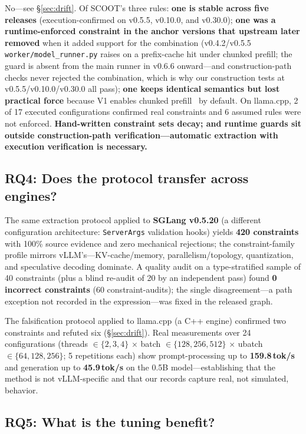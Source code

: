 \documentclass[journal]{IEEEtran}
\newcommand{\code}[1]{\texttt{#1}}
\begin{document}
No---see \S\ref{sec:drift}. Of SCOOT's three rules: \textbf{one is stable across five releases} (execution-confirmed on v0.5.5, v0.10.0, and v0.30.0); \textbf{one was a runtime-enforced constraint in the anchor versions that upstream later removed} when it added support for the combination (v0.4.2/v0.5.5 \code{worker/model\_runner.py} raises on a prefix-cache hit under chunked prefill; the guard is absent from the main runner in v0.6.6 onward---and construction-path checks never rejected the combination, which is why our construction tests at v0.5.5/v0.10.0/v0.30.0 all pass); \textbf{one keeps identical semantics but lost practical force} because V1 enables chunked prefill~\cite{ref14} by default. On llama.cpp, 2 of 17 executed configurations confirmed real constraints and 6 assumed rules were not enforced. \textbf{Hand-written constraint sets decay; and runtime guards sit outside construction-path verification---automatic extraction with execution verification is necessary.}

\subsection{RQ4: Does the protocol transfer across engines?}

The same extraction protocol applied to \textbf{SGLang v0.5.20} (a different configuration architecture: \code{ServerArgs} validation hooks) yields \textbf{420 constraints} with 100\% source evidence and zero mechanical rejections; the constraint-family profile mirrors vLLM's---KV-cache/memory, parallelism/topology, quantization, and speculative decoding dominate. A quality audit on a type-stratified sample of 40 constraints (plus a blind re-audit of 20 by an independent pass) found \textbf{0 incorrect constraints} (60 constraint-audits); the single disagreement---a path exception not recorded in the expression---was fixed in the released graph.

The falsification protocol applied to llama.cpp (a C++ engine) confirmed two constraints and refuted six (\S\ref{sec:drift}). Real measurements over 24 configurations (threads $\in \{2,3,4\}$ $\times$ batch $\in \{128,256,512\}$ $\times$ ubatch $\in \{64,128,256\}$; 5 repetitions each) show prompt-processing up to \textbf{159.8\,tok/s} and generation up to \textbf{45.9\,tok/s} on the 0.5B model---establishing that the method is not vLLM-specific and that our records capture real, not simulated, behavior.

\subsection{RQ5: What is the tuning benefit?}
\label{sec:rq5}
\end{document}
